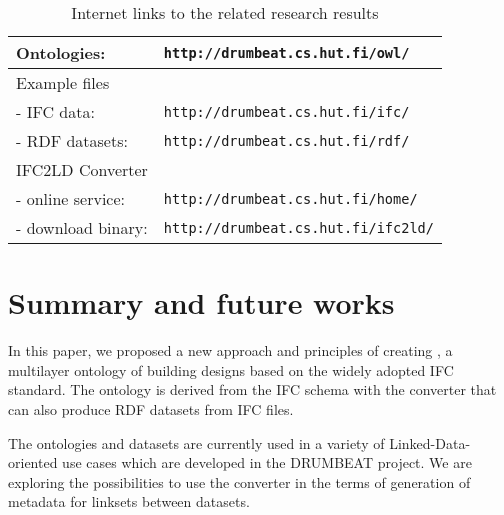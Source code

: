 \begin{table}[b]
    \caption{Internet links to the related research results}
    \label{tab:ifc2ld-web}
    \centering
    \scriptsize
    \def\arraystretch{1.2}          %
    \setlength{\tabcolsep}{6pt}     %
    \begin{tabularx}{0.90\textwidth}{|l|X|}
        \hline
        Ontologies: & \texttt{http://drumbeat.cs.hut.fi/owl/} \\
        \hline
        Example files & \\
        - IFC data: & \texttt{http://drumbeat.cs.hut.fi/ifc/} \\
        - RDF datasets: & \texttt{http://drumbeat.cs.hut.fi/rdf/} \\
        \hline
        IFC2LD Converter & \\
        - online service: & \texttt{http://drumbeat.cs.hut.fi/home/} \\
        - download binary: & \texttt{http://drumbeat.cs.hut.fi/ifc2ld/} \\
        \hline
    \end{tabularx}
\end{table}

\section{Summary and future works}
\label{sec:summary}

In this paper, we proposed a new approach and principles of creating \ifcowl{}, a multilayer ontology of building designs based on the widely adopted IFC standard. The ontology is 
derived from the IFC schema with the \ifcld{} converter that can also produce RDF datasets from IFC files. 

The \ifcowl{} ontologies and \ifcrdf{} datasets are currently used in a variety of Linked-Data-oriented use cases \cite{torma2013semantic} which are developed in the DRUMBEAT project. We are exploring the possibilities to use the \ifcld{} converter in the terms of generation of metadata for linksets between \ifcrdf{} datasets.



